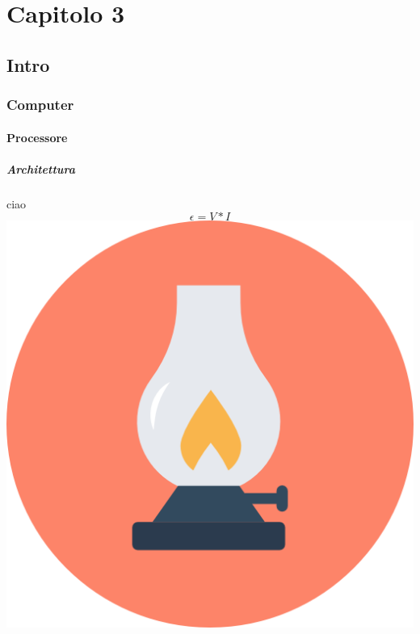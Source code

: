 \newpage
\section{Capitolo 3}
\subsection{Intro}
\subsubsection{Computer}
\paragraph{Processore}
\subparagraph{Architettura}
ciao $$ \epsilon = V * I $$
\includegraphics[scale=0.5]{Immagini/icon.png}
